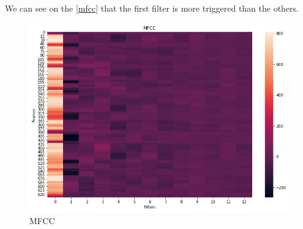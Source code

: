 \documentclass[]{article}
\begin{document}
We can see on the \autoref{mfcc} that the first filter is more triggered than the others.

\begin{figure}[H]
    \centering
    \caption{\label{mfcc}MFCC}
    \includegraphics[scale=0.5]{images/mfcc.png}
\end{figure}



\end{document}
